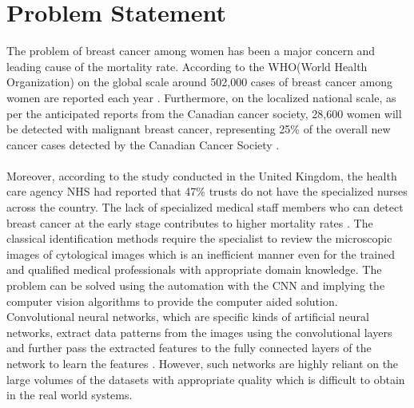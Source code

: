 \section{Problem Statement}
The problem of breast cancer among women has been a major concern and leading cause of the mortality rate.
According to the WHO(World Health Organization) on the global scale around 502,000 cases of breast cancer among women are reported each year \citep*{jelen2008classification}. 
Furthermore, on the localized national scale, as per the anticipated reports from the Canadian cancer society, 28,600 women will be detected 
with malignant breast cancer, representing 25\% of the overall new cancer cases detected by the Canadian Cancer Society \citet{CanadianCancerSociety}.
\paragraph*{}
Moreover, according to the study conducted in the United Kingdom, the health care agency NHS had reported that 47\% trusts do not have the 
specialized nurses across the country. The lack of specialized medical staff members who can detect breast cancer at the early stage contributes to higher mortality rates \citep{tan2017breast}. 
The classical identification methods require the specialist to review the microscopic images of cytological images which is an inefficient manner even for the trained and qualified medical professionals with appropriate domain knowledge.
The problem can be solved using the automation with the CNN and implying the computer vision algorithms to provide the computer aided solution. Convolutional neural networks, 
which are specific kinds of artificial neural networks, extract data patterns 
from the images using the convolutional layers and further pass the extracted features to the fully connected 
layers of the network to learn the features \citep{wani2020basics}. However, such networks are highly reliant on the large volumes 
of the datasets with appropriate quality which is difficult to obtain in the real world systems. 


\pagebreak




